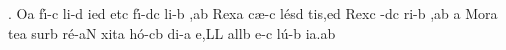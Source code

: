 \Internote
\nosolesmescustos
\initiumgregorianum
\sgn {}{\oldstyle 1\rm}.\egn
\spatium
\sgn {}O{}\punctum a\egn
\spatium
\sgn f{\'\i}-\punctum c\egn
\sgn li-\punctum d\egn
\sgn {}i{}\clivis ed\egn
\spatium
\sgn {}et\punctum c\egn
\spatium
\sgn f{\'\i}-\clivis dc\egn
\sgn li-\punctum b\egn
\sgn {}{\ae},\punctum a\augmentum b\egn
\spatium
\divisiominor
\spatium
\sgn Rex\punctum a\egn
\spatium
\sgn c{\ae}-\punctum c\egn
\sgn l{\'e}s\punctum d\egn
\sgn ti{s,}\clivis ed\egn
\spatium
\sgn Rex\punctum c\egn
\spatium
{}-\clivis dc\egn
\sgn ri-\punctum b\egn
\sgn {}{\ae},\punctum a\augmentum b\egn
\spatium
\divisiominor
\spatium
\custos a\lineaproxima
\sgn M{o}r\punctum a\egn
\sgn te{}\punctum a\egn
\spatium
\sgn sur\punctum b\egn
\sgn r{\'e}-\clivis aN\egn
\sgn xit\punctum a\egn
\spatium
\sgn h{\'o}-\clivis cb\egn
\sgn di-\punctum a\egn
\sgn {}e,\punctum L\augmentum L\egn
\spatium
\divisiominor
\spatium
\sgn {}a{ll}\punctum b\egn
\sgn {}e-\punctum c\egn
\sgn l{\'u}-\punctum b\egn
\sgn ia.\punctum a\augmentum b\egn
\spatium
\Finisgregoriana

\medskip

\beginlyrics

